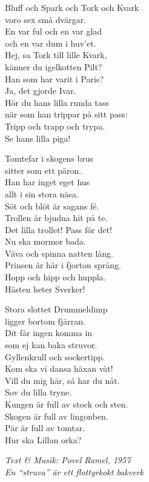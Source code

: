 \vspace{10pt}
Bluff och Spark och Tork och Kvark\\
voro sex små dvärgar.\\
En var ful och en var glad \\
och en var dum i huv'et.\\
Hej, sa Tork till lille Kvark,\\
känner du igelkotten Pilt?\\
Han som har varit i Paris?\\
Ja, det gjorde Ivar.\\
Hör du hans lilla runda tass\\
när som han trippar på sitt pass:\\
Tripp och trapp och trypa.\\
Se hans lilla piga!\par
\vspace{10pt}
Tomtefar i skogens brus\\
sitter som ett päron.\\
Han har inget eget hus \\
allt i sin stora näsa.\\
Söt och blöt är sagans fé.\\
Trollen är bjudna hit på te.\\
Det lilla trollet! Pass för det!\\
Nu ska mormor bada.\\
Väva och spinna natten lång.\\
Prinsen är här i fjorton språng.\\
Hopp och hipp och huppla.\\
Hästen heter Sverker!\par
\newpage
Stora slottet Drummeldimp\\
ligger bortom fjärran.\\
Dit får ingen komma in\\
som ej kan baka struvor.\\
Gyllenkrull och sockertipp.\\
Kom ska vi dansa häxan våt!\\
Vill du mig här, så har du nåt.\\
Sov du lilla tryne.\\
Kungen är full av stock och sten.\\
Skogen är full av lingonben.\\
Pär är full av tomtar.\\
Hur ska Lillan orka?\par
\vspace{10pt}
{\footnotesize\textit{Text \& Musik: Povel Ramel, 1957\\ En
    ``struva'' är ett flottyrkokt bakverk}}
